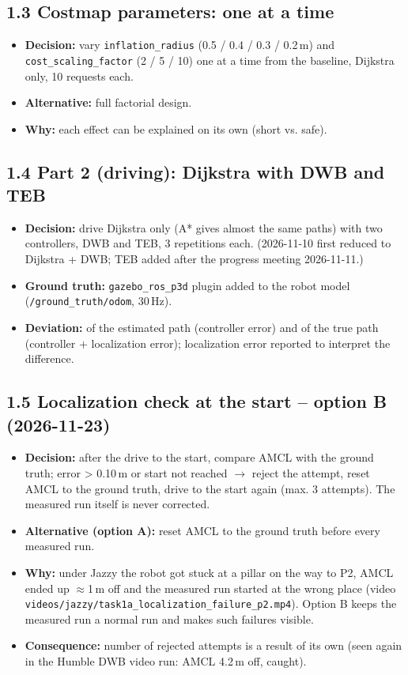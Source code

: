 \documentclass[10pt]{article}
\newcommand{\pkg}[1]{\texttt{#1}}
\begin{document}
\subsection*{1.3 Costmap parameters: one at a time}
\begin{itemize}
  \item \textbf{Decision:} vary \pkg{inflation\_radius} (0.5 / 0.4 / 0.3 / 0.2\,m) and \pkg{cost\_scaling\_factor} (2 / 5 / 10) one at a time from the baseline, Dijkstra only, 10 requests each.
  \item \textbf{Alternative:} full factorial design.
  \item \textbf{Why:} each effect can be explained on its own (short vs. safe).
\end{itemize}

\subsection*{1.4 Part 2 (driving): Dijkstra with DWB and TEB}
\begin{itemize}
  \item \textbf{Decision:} drive Dijkstra only (A* gives almost the same paths) with two controllers, DWB and TEB, 3 repetitions each. (2026-11-10 first reduced to Dijkstra + DWB; TEB added after the progress meeting 2026-11-11.)
  \item \textbf{Ground truth:} \pkg{gazebo\_ros\_p3d} plugin added to the robot model (\pkg{/ground\_truth/odom}, 30\,Hz).
  \item \textbf{Deviation:} of the estimated path (controller error) and of the true path (controller + localization error); localization error reported to interpret the difference.
\end{itemize}

\subsection*{1.5 Localization check at the start -- option B (2026-11-23)}
\begin{itemize}
  \item \textbf{Decision:} after the drive to the start, compare AMCL with the ground truth; error > 0.10\,m or start not reached $\rightarrow$ reject the attempt, reset AMCL to the ground truth, drive to the start again (max. 3 attempts). The measured run itself is never corrected.
  \item \textbf{Alternative (option A):} reset AMCL to the ground truth before every measured run.
  \item \textbf{Why:} under Jazzy the robot got stuck at a pillar on the way to P2, AMCL ended up $\approx$1\,m off and the measured run started at the wrong place (video \pkg{videos/jazzy/task1a\_localization\_failure\_p2.mp4}). Option B keeps the measured run a normal run and makes such failures visible.
  \item \textbf{Consequence:} number of rejected attempts is a result of its own (seen again in the Humble DWB video run: AMCL 4.2\,m off, caught).
\end{itemize}
\end{document}
